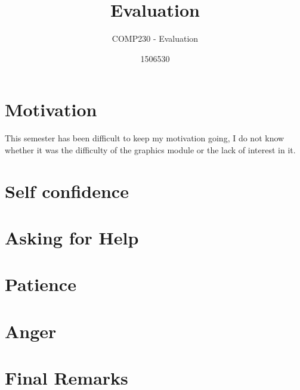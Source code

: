\documentclass{scrartcl}
\title{Evaluation}
\subtitle{COMP230 - Evaluation}
\author{1506530}
\begin{document}
\section{Motivation}
This semester has been difficult to  keep my motivation going, I do not know whether it was the difficulty of the graphics module or the lack of interest in it.

\section{Self confidence}

\section{Asking for Help}


\section{Patience}

\section{Anger}

\section{Final Remarks}




\end{document}
